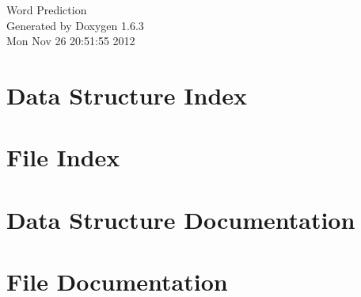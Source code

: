 \documentclass[a4paper]{book}
\begin{document}
\hypersetup{pageanchor=false}
\begin{titlepage}
\vspace*{7cm}
\begin{center}
{\Large Word Prediction }\\
\vspace*{1cm}
{\large Generated by Doxygen 1.6.3}\\
\vspace*{0.5cm}
{\small Mon Nov 26 20:51:55 2012}\\
\end{center}
\end{titlepage}
\clearemptydoublepage
{}
\tableofcontents
\clearemptydoublepage
{}
\hypersetup{pageanchor=true}
\chapter{Data Structure Index}

\chapter{File Index}

\chapter{Data Structure Documentation}


\chapter{File Documentation}



























\printindex
\end{document}
